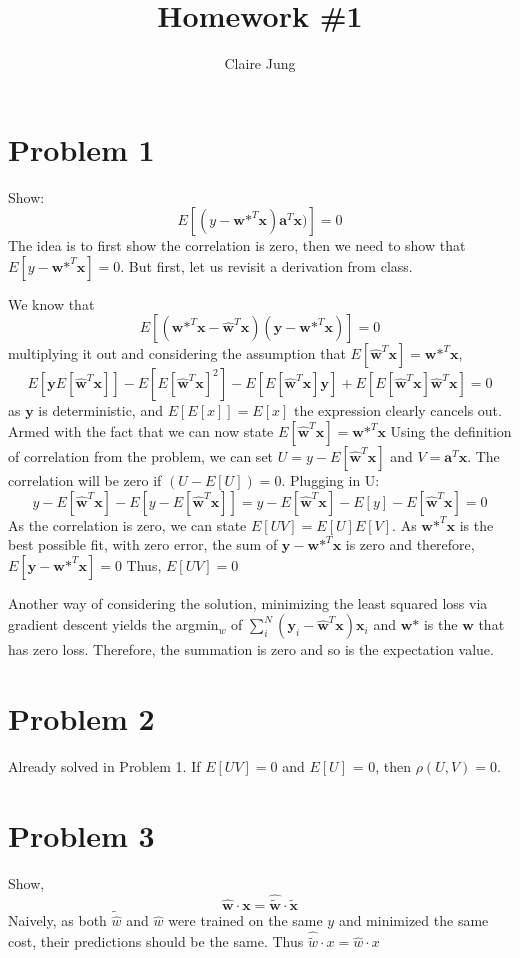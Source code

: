 \documentclass[]{article}
\title{Homework \#1}
\author{Claire Jung}
\begin{document}
\maketitle

\section*{Problem 1}
Show:
\[
E[(y-\textbf{w*}^T\textbf{x})\textbf{a}^T\textbf{x})] = 0
\]
The idea is to first show the correlation is zero, then we need to show that $E[y-\textbf{w*}^T\textbf{x}]=0$. But first, let us revisit a derivation from class.

We know that
\[
E[(\textbf{w*}^T\textbf{x}-\hat{\textbf{w}}^T\textbf{x})(\textbf{y}-\textbf{w*}^T\textbf{x})] = 0
\]
multiplying it out and considering the assumption that $E[\hat{\textbf{w}}^T\textbf{x}]=\textbf{w*}^T\textbf{x}$,
\[
E[\textbf{y}E[\hat{\textbf{w}}^T\textbf{x}]]-E[E[\hat{\textbf{w}}^T\textbf{x}]^2]-E[E[\hat{\textbf{w}}^T\textbf{x}]\textbf{y}] + E[E[\hat{\textbf{w}}^T\textbf{x}]\hat{\textbf{w}}^T\textbf{x}] = 0
\]
as $\textbf{y}$ is deterministic, and $E[E[x]]=E[x]$ the expression clearly cancels out.
Armed with the fact that we can now state $E[\hat{\textbf{w}}^T\textbf{x}]=\textbf{w*}^T\textbf{x}$
Using the definition of correlation from the problem, we can set $U=y-E[\hat{\textbf{w}}^T\textbf{x}]$ and $V=\textbf{a}^T\textbf{x}$. The correlation will be zero if $(U-E[U])=0$.
Plugging in U:
\[
y-E[\hat{\textbf{w}}^T\textbf{x}]-E[y-E[\hat{\textbf{w}}^T\textbf{x}]] = y-E[\hat{\textbf{w}}^T\textbf{x}]-E[y]-E[\hat{\textbf{w}}^T\textbf{x}] = 0
\]
As the correlation is zero, we can state $E[UV] = E[U]E[V]$. As $\textbf{w*}^T\textbf{x}$ is the best possible fit, with zero error, the sum of $\textbf{y}-\textbf{w*}^T\textbf{x}$ is zero and therefore, $E[\textbf{y}-\textbf{w*}^T\textbf{x}] = 0$
Thus, $E[UV] = 0$

Another way of considering the solution, minimizing the least squared loss via gradient descent yields the argmin$_w$ of $\sum_{i}^{N}(\textbf{y}_i-\hat{\textbf{w}}^T\textbf{x})\textbf{x}_i$ and $\textbf{w*}$ is the $\textbf{w}$ that has zero loss. Therefore, the summation is zero and so is the expectation value.
\section*{Problem 2}
Already solved in Problem 1. If $E[UV]=0$ and $E[U]$ = 0, then $\rho(U,V) = 0$.
\section*{Problem 3}
Show, \[
\hat{\textbf{w}}\cdot\textbf{x} = \hat{\tilde{\textbf{w}}}\cdot\tilde{\textbf{x}}
\]
Naively, as both $\tilde{\hat{w}}$ and $\hat{w}$ were trained on the same $y$ and minimized the same cost, their predictions should be the same. Thus $\hat{\tilde{w}}\cdot x = \hat{w}\cdot x$
\end{document}

